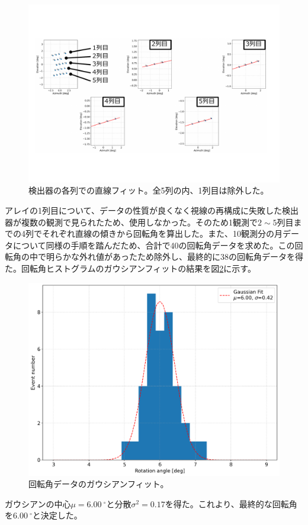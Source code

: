 \begin{figure}[htbp]
  \centering
  \includegraphics[width=1.05\columnwidth]{5_alignment/figs/angle_cal_lines.pdf}
  \caption{検出器の各列での直線フィット。全5列の内、1列目は除外した。}
  \label{linear_fit}
\end{figure}
アレイの1列目について、データの性質が良くなく視線の再構成に失敗した検出器が複数の観測で見られたため、使用しなかった。そのため1観測で$2\sim5$列目までの4列でそれぞれ直線の傾きから回転角を算出した。また、10観測分の月データについて同様の手順を踏んだため、合計で40の回転角データを求めた。この回転角の中で明らかな外れ値があったため除外し、最終的に38の回転角データを得た。回転角ヒストグラムのガウシアンフィットの結果を図\ref{gaussian_fit}に示す。
\begin{figure}[htbp]
  \centering
  \includegraphics[width=0.85\columnwidth]{5_alignment/figs/hist_rotation_angle2.png}
  \caption{回転角データのガウシアンフィット。}
  \label{gaussian_fit}
\end{figure}
ガウシアンの中心$\mu=\SI{6.00}{^{\circ}}$と分散$\sigma^{2}=0.17$を得た。これより、最終的な回転角を$\SI{6.00}{^{\circ}}$と決定した。

